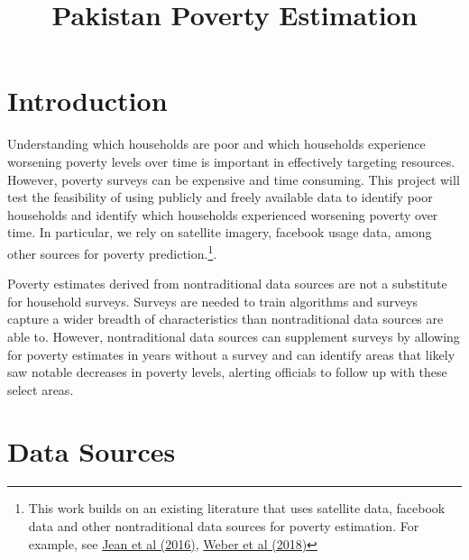 \documentclass[8pt, oneside]{article}
\title{Pakistan Poverty Estimation}
\begin{document}
\maketitle

\section{Introduction}

Understanding which households are poor and which households experience worsening poverty levels over time is important in effectively targeting resources. However, poverty surveys can be expensive and time consuming. This project will test the feasibility of using publicly and freely available data to identify poor households and identify which households experienced worsening poverty over time. In particular, we rely on satellite imagery, facebook usage data, among other sources for poverty prediction.\footnote{This work builds on an existing literature that uses satellite data, facebook data and other nontraditional data sources for poverty estimation. For example, see \href{https://web.stanford.edu/~mburke/papers/JeanBurkeEtAl2016.pdf}{Jean et al (2016)}, \href{https://www.itu.int/dms_pub/itu-s/opb/journal/S-JOURNAL-ICTF.VOL1-2018-2-P04-PDF-E.pdf}{Weber et al (2018)}}.
\par
Poverty estimates derived from nontraditional data sources are not a substitute for household surveys. Surveys are needed to train algorithms and surveys capture a wider breadth of characteristics than nontraditional data sources are able to. However, nontraditional data sources can supplement surveys by allowing for poverty estimates in years without a survey and can identify areas that likely saw notable decreases in poverty levels, alerting officials to follow up with these select areas.

\section{Data Sources}
\end{document}
